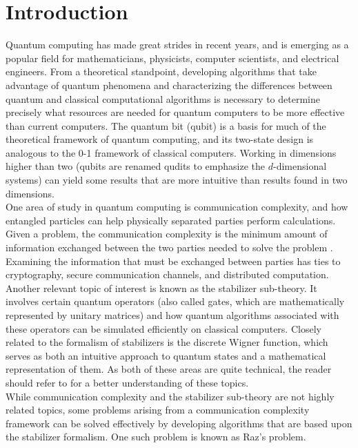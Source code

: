 \documentclass[../3Wworkreport.tex]{subfiles}
\begin{document}
\section{Introduction}
\label{sec:intro}

Quantum computing has made great strides in recent years, and is emerging as a popular field for mathematicians, physicists, computer scientists, and electrical engineers. From a theoretical standpoint, developing algorithms that take advantage of quantum phenomena and characterizing the differences between quantum and classical computational algorithms is necessary to determine precisely what resources are needed for quantum computers to be more effective than current computers. The quantum bit (qubit) is a basis for much of the theoretical framework of quantum computing, and its two-state design is analogous to the 0-1 framework of classical computers. Working in dimensions higher than two (qubits are renamed qudits to emphasize the $d$-dimensional systems) can yield some results that are more intuitive than results found in two dimensions.\\

One area of study in quantum computing is communication complexity, and how entangled particles can help physically separated parties perform calculations. Given a problem, the communication complexity is the minimum amount of information exchanged between the two parties needed to solve the problem \parencite{kushilevitz2006}. Examining the information that must be exchanged between parties has ties to cryptography, secure communication channels, and distributed computation.\\

Another relevant topic of interest is known as the stabilizer sub-theory. It involves certain quantum operators (also called gates, which are mathematically represented by unitary matrices) and how quantum algorithms associated with these operators can be simulated efficiently on classical computers. Closely related to the formalism of stabilizers is the discrete Wigner function, which serves as both an intuitive approach to quantum states and a mathematical representation of them. As both of these areas are quite technical, the reader should refer to  for a better understanding of these topics.\\

While communication complexity and the stabilizer sub-theory are not highly related topics, some problems arising from a communication complexity framework can be solved effectively by developing algorithms that are based upon the stabilizer formalism. One such problem is known as Raz's problem.\\
\end{document}
